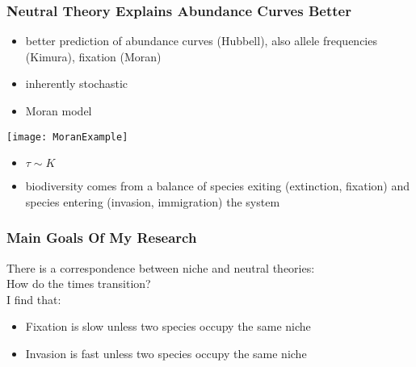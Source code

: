 \documentclass{beamer}
\begin{document}
\begin{frame}
\frametitle{Neutral Theory Explains Abundance Curves Better}
\begin{itemize}
	\item better prediction of abundance curves (Hubbell), also allele frequencies (Kimura), fixation (Moran)
	\item inherently stochastic
	\pause
	\item Moran model
\end{itemize}
\centering
\texttt{[image: MoranExample]}
\begin{itemize}
	\item $\tau \sim K$
	\pause
	\item \small{biodiversity comes from a balance of species exiting (extinction, fixation) and species entering (invasion, immigration) the system}
\end{itemize}
\end{frame}


\begin{frame}
\frametitle{Main Goals Of My Research}
There is a correspondence between niche and neutral theories: \\
How do the times transition? \\
\pause
I find that:
\begin{itemize}
	\item Fixation is slow unless two species occupy the same niche
	\pause
	\item Invasion is fast unless two species occupy the same niche
\end{itemize}
\end{frame}
\end{document}
